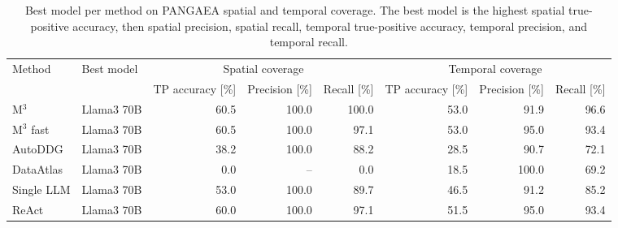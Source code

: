 \begin{table}
\caption{Best model per method on PANGAEA spatial and temporal coverage. The best model is the highest spatial true-positive accuracy, then spatial precision, spatial recall, temporal true-positive accuracy, temporal precision, and temporal recall.}
\label{tab:best_method_spat_temp}
\begin{tabular}{llrrrrrr}
\toprule
Method & Best model & \multicolumn{3}{c}{Spatial coverage} & \multicolumn{3}{c}{Temporal coverage} \\
\cmidrule(lr){3-5} \cmidrule(lr){6-8}
 &  & TP accuracy [\%] & Precision [\%] & Recall [\%] & TP accuracy [\%] & Precision [\%] & Recall [\%] \\
\midrule
M$^3$ & Llama3 70B & 60.5 & 100.0 & 100.0 & 53.0 & 91.9 & 96.6 \\
M$^3$ fast & Llama3 70B & 60.5 & 100.0 & 97.1 & 53.0 & 95.0 & 93.4 \\
AutoDDG & Llama3 70B & 38.2 & 100.0 & 88.2 & 28.5 & 90.7 & 72.1 \\
DataAtlas & Llama3 70B & 0.0 & -- & 0.0 & 18.5 & 100.0 & 69.2 \\
Single LLM & Llama3 70B & 53.0 & 100.0 & 89.7 & 46.5 & 91.2 & 85.2 \\
ReAct & Llama3 70B & 60.0 & 100.0 & 97.1 & 51.5 & 95.0 & 93.4 \\
\bottomrule
\end{tabular}
\end{table}
